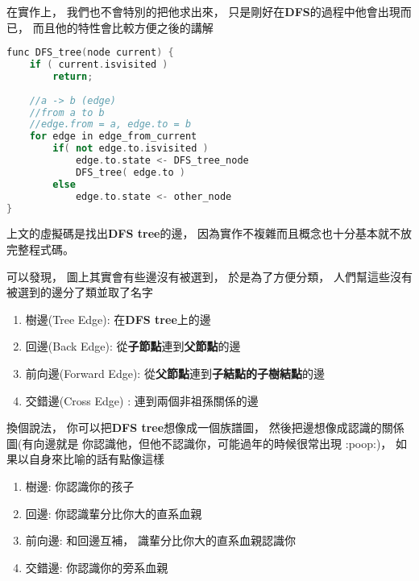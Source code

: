 \documentclass[12pt,oneside]{article}
\begin{document}
在實作上，
我們也不會特別的把他求出來，
只是剛好在\textbf{DFS}的過程中他會出現而已，
而且他的特性會比較方便之後的講解
\vspace*{3em}
\begin{lstlisting}[language=C++,escapeinside=``]
func DFS_tree(node current) {
    if ( current.isvisited ) 
        return;
    
    //a -> b (edge)
    //from a to b
    //edge.from = a, edge.to = b
    for edge in edge_from_current 
        if( not edge.to.isvisited )
            edge.to.state <- DFS_tree_node
            DFS_tree( edge.to )
        else   
            edge.to.state <- other_node
}
\end{lstlisting}
\vspace*{3em}

上文的虛擬碼是找出\textbf{DFS tree}的邊，
因為實作不複雜而且概念也十分基本就不放完整程式碼。

可以發現，
圖上其實會有些邊沒有被選到，
於是為了方便分類，
人們幫這些沒有被選到的邊分了類並取了名字

\begin{enumerate}
    \item 
        樹邊(Tree Edge): 在\textbf{DFS tree}上的邊
    \item 
        回邊(Back Edge): 從\textbf{子節點}連到\textbf{父節點}的邊
    \item 
        前向邊(Forward Edge): 從\textbf{父節點}連到\textbf{子結點的子樹結點}的邊
    \item 
        {\color{blue}交錯邊}(Cross Edge) : 連到兩個非祖孫關係的邊
\end{enumerate}

換個說法，
你可以把\textbf{DFS tree}想像成一個族譜圖，
然後把邊想像成認識的關係圖(有向邊就是 你認識他，但他不認識你，可能過年的時候很常出現 :poop:)，
如果以自身來比喻的話有點像這樣

\begin{enumerate}
    \item 樹邊: 你認識你的孩子
    \item 回邊: 你認識輩分比你大的直系血親
    \item 前向邊: 和回邊互補， 識輩分比你大的直系血親認識你
    \item 交錯邊: 你認識你的旁系血親
\end{enumerate}
\end{document}
